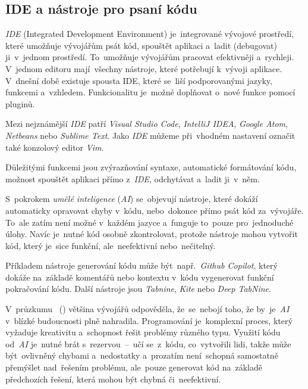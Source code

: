 \documentclass[10pt,a4paper]{article}
\begin{document}
        \subsection{IDE a nástroje pro psaní kódu}
            \emph{IDE} (Integrated Development Environment) je~integrované vývojové prostředí, které umožňuje vývojářům psát kód, spouštět aplikaci a~ladit (debugovat) ji~v~jednom prostředí. To~umožňuje vývojářům pracovat efektivněji a~rychleji. V~jednom editoru mají~všechny nástroje, které potřebují k~vývoji aplikace. V~dnešní době existuje spousta IDE, které se~liší podporovanými jazyky, funkcemi a~vzhledem. Funkcionalitu je~možné doplňovat o~nové funkce pomocí pluginů.
            
            Mezi nejznámější \emph{IDE} patří \emph{Visual Studio Code}, \emph{IntelliJ IDEA}, \emph{Google Atom}, \emph{Netbeans} nebo \emph{Sublime Text}. Jako \emph{IDE} můžeme při~vhodném nastavení označit také konzolový editor \emph{Vim}.
            
            Důležitými funkcemi jsou zvýrazňování syntaxe, automatické formátování kódu, možnost spouštět aplikaci přímo z~\emph{IDE}, odchytávat a~ladit ji~v~něm. \cite{IDE}
            
            S~pokrokem \emph{umělé inteligence} (\emph{AI}) se~objevují nástroje, které dokáží automaticky opravovat chyby v~kódu, nebo~dokonce přímo psát kód za~vývojáře. To~ale zatím není možné v~každém jazyce a~funguje to~pouze pro~jednoduché úlohy. Navíc je~nutné kód osobně zkontrolovat, protože nástroje mohou vytvořit kód, který je~sice funkční, ale~neefektivní nebo~nečitelný.

            Příkladem nástroje generování kódu může být~např.~\emph{Github Copilot}, který dokáže na~základě komentářů nebo kontextu v~kódu vygenerovat funkční pokračování kódu. Další nástroje jsou \emph{Tabnine}, \emph{Kite} nebo \emph{Deep TabNine}. \cite{sz:AI}
            
            V~průzkumu ~(\cite{zerotomasteryStateOfAI}) většina vývojářů odpověděla, že~se~nebojí toho, že by~je~\emph{AI} v~blízké budoucnosti plně nahradila. Programování je~komplexní proces, který vyžaduje kreativitu a~schopnost řešit problémy různého typu. Využití kódu od~\emph{AI} je~nutné brát s~rezervou~--~učí se~z~kódu, co~vytvořili lidi, takže může být~ovlivněný chybami a~nedostatky a~prozatím není~schopná samostatně přemýšlet nad~řešením problému, ale~pouze generovat kód na~základě předchozích řešení, která mohou být chybná či~neefektivní.
            
\end{document}

